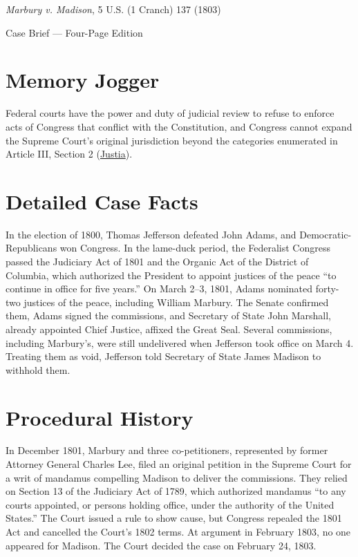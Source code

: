 \documentclass[12pt]{article}
\begin{document}
\begin{center}
{\LARGE \textit{Marbury v. Madison}, 5 U.S. (1 Cranch) 137 (1803)\par}
\vspace{0.8em}
{\large Case Brief --- Four-Page Edition\par}
\end{center}
\vspace{1em}

\section{Memory Jogger}

Federal courts have the power and duty of judicial review to refuse to enforce acts of Congress that conflict with the Constitution, and Congress cannot expand the Supreme Court's original jurisdiction beyond the categories enumerated in Article III, Section 2 (\href{https://supreme.justia.com/cases/federal/us/5/137/}{Justia}).

\section{Detailed Case Facts}

In the election of 1800, Thomas Jefferson defeated John Adams, and Democratic-Republicans won Congress. In the lame-duck period, the Federalist Congress passed the Judiciary Act of 1801 and the Organic Act of the District of Columbia, which authorized the President to appoint justices of the peace ``to continue in office for five years.'' On March 2--3, 1801, Adams nominated forty-two justices of the peace, including William Marbury. The Senate confirmed them, Adams signed the commissions, and Secretary of State John Marshall, already appointed Chief Justice, affixed the Great Seal. Several commissions, including Marbury's, were still undelivered when Jefferson took office on March 4. Treating them as void, Jefferson told Secretary of State James Madison to withhold them.

\section{Procedural History}

In December 1801, Marbury and three co-petitioners, represented by former Attorney General Charles Lee, filed an original petition in the Supreme Court for a writ of mandamus compelling Madison to deliver the commissions. They relied on Section 13 of the Judiciary Act of 1789, which authorized mandamus ``to any courts appointed, or persons holding office, under the authority of the United States.'' The Court issued a rule to show cause, but Congress repealed the 1801 Act and cancelled the Court's 1802 terms. At argument in February 1803, no one appeared for Madison. The Court decided the case on February 24, 1803.
\end{document}

